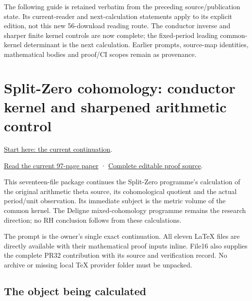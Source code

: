 \documentclass[
]{article}
\begin{document}
The following guide is retained verbatim from the preceding
source/publication state. Its current-reader and next-calculation
statements apply to its explicit edition, not this new 56-download
reading route. The conductor inverse and sharper finite kernel controls
are now complete; the fixed-period leading common-kernel determinant is
the next calculation. Earlier prompts, source-map identities,
mathematical bodies and proof/CI scopes remain as provenance.

\section{Split-Zero cohomology: conductor kernel and sharpened
arithmetic
control}\label{split-zero-cohomology-conductor-kernel-and-sharpened-arithmetic-control}

\href{https://github.com/KokunoYumeto/zeta-function-research-reader/blob/main/workbenches/splitzero-tandem/continuations/20260914-conductor-kernel-continuation/00_CONTINUE_HERE.md}{Start
here: the current continuation}.

\href{https://github.com/KokunoYumeto/zeta-function-research-reader/blob/main/workbenches/splitzero-tandem/continuations/20260914-conductor-kernel-continuation/15_CURRENT_MIXED_CONTROL_READER.pdf}{Read
the current 97-page paper} ·
\href{https://github.com/KokunoYumeto/zeta-function-research-reader/blob/main/workbenches/splitzero-tandem/continuations/20260914-conductor-kernel-continuation/14_CURRENT_KERNEL_AND_MULTIPLICITY_PROOFS.tex}{Complete
editable proof source}.

This seventeen-file package continues the Split-Zero programme's
calculation of the original arithmetic theta source, its cohomological
quotient and the actual period/unit observation. Its immediate subject
is the metric volume of the common kernel. The Deligne mixed-cohomology
programme remains the research direction; no RH conclusion follows from
these calculations.

The prompt is the owner's single exact continuation. All eleven LaTeX
files are directly available with their mathematical proof inputs
inline. File16 also supplies the complete PR32 contribution with its
source and verification record. No archive or missing local TeX provider
folder must be unpacked.

\subsection{The object being
calculated}\label{the-object-being-calculated}
\end{document}
